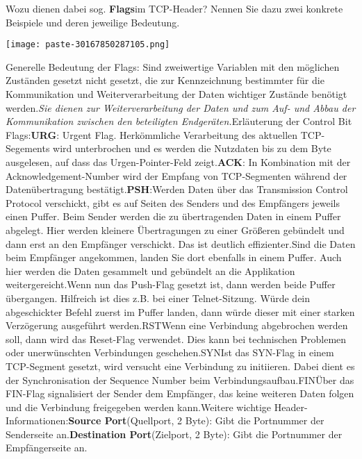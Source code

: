\documentclass{article}
\begin{document}
\begin{tcolorbox}[colback=white!10!white,colframe=lightgray!75!black,
  savelowerto=\jobname_ex.tex,breakable,enhanced,lines before break=40]

\justifying
Wozu dienen dabei sog. \textbf{Flags}im TCP-Header? Nennen Sie dazu zwei konkrete Beispiele und deren jeweilige Bedeutung.

\tcblower

\justifying
\begin{center}
\texttt{[image: paste-30167850287105.png]}
\end{center}
Generelle Bedeutung der Flags: Sind zweiwertige Variablen mit den möglichen Zuständen gesetzt nicht gesetzt, die zur Kennzeichnung bestimmter für die Kommunikation und Weiterverarbeitung der Daten wichtiger Zustände benötigt werden.\textit{Sie dienen zur Weiterverarbeitung der Daten und zum Auf- und Abbau der Kommunikation zwischen den beteiligten Endgeräten.}Erläuterung der Control Bit Flags:\textbf{URG}: Urgent Flag. Herkömmliche Verarbeitung des aktuellen TCP-Segements wird unterbrochen und es werden die Nutzdaten bis zu dem Byte ausgelesen, auf dass das Urgen-Pointer-Feld zeigt.\textbf{ACK}: In Kombination mit der Acknowledgement-Number wird der Empfang von TCP-Segmenten während der Datenübertragung bestätigt.\textbf{PSH}:Werden Daten über das Transmission Control Protocol verschickt, gibt es auf Seiten des Senders und des Empfängers jeweils einen Puffer. Beim Sender werden die zu übertragenden Daten in einem Puffer abgelegt. Hier werden kleinere Übertragungen zu einer Größeren gebündelt und dann erst an den Empfänger verschickt. Das ist deutlich effizienter.Sind die Daten beim Empfänger angekommen, landen Sie dort ebenfalls in einem Puffer. Auch hier werden die Daten gesammelt und gebündelt an die Applikation weitergereicht.Wenn nun das Push-Flag gesetzt ist, dann werden beide Puffer übergangen. Hilfreich ist dies z.B. bei einer Telnet-Sitzung. Würde dein abgeschickter Befehl zuerst im Puffer landen, dann würde dieser mit einer starken Verzögerung ausgeführt werden.RSTWenn eine Verbindung abgebrochen werden soll, dann wird das Reset-Flag verwendet. Dies kann bei technischen Problemen oder unerwünschten Verbindungen geschehen.SYNIst das SYN-Flag in einem TCP-Segment gesetzt, wird versucht eine Verbindung zu initiieren. Dabei dient es der Synchronisation der Sequence Number beim Verbindungsaufbau.FINÜber das FIN-Flag signalisiert der Sender dem Empfänger, das keine weiteren Daten folgen und die Verbindung freigegeben werden kann.Weitere wichtige Header-Informationen:\textbf{Source Port}(Quellport, 2 Byte): Gibt die Portnummer der Senderseite an.\textbf{Destination Port}(Zielport, 2 Byte): Gibt die Portnummer der Empfängerseite an.
\end{tcolorbox}
\end{document}

